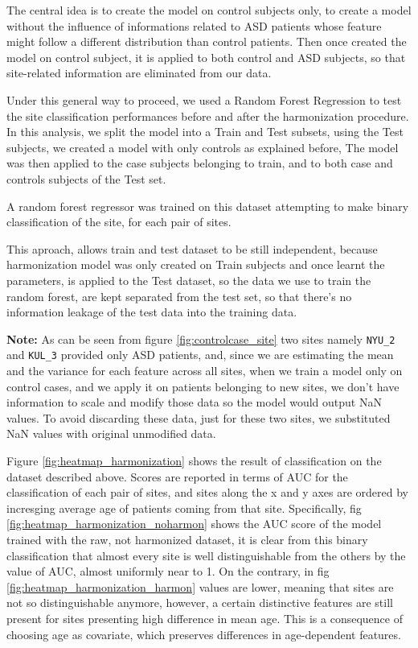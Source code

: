 \documentclass[a4paper,11pt]{article}
\begin{document}

The central idea is to create the model on control subjects only, to create a model without the influence of informations related to ASD patients whose feature might follow a different distribution than control patients.
Then once created the model on control subject, it is applied to both control and ASD subjects, so that site-related information are eliminated from our data.

Under this general way to proceed, we used a Random Forest Regression to test the site classification performances before and after the harmonization procedure.
In this analysis, we split the model into a Train and Test subsets, using the Test subjects, we created a model with only controls as explained before,
The model was then applied to the case subjects belonging to train, and to both case and controls subjects of the Test set.

A random forest regressor was trained on this dataset attempting to make binary classification of the site, for each pair of sites.

This aproach, allows train and test dataset to be still independent, because harmonization model was only created on Train subjects and once learnt the parameters, is applied to the Test dataset, so the data we use to train the random forest, are kept separated from the test set, so that there's no information leakage of the test data into the training data.
\newline

\textbf{Note:} As can be seen from figure \ref{fig:controlcase_site} two sites namely \texttt{NYU\_2} and \texttt{KUL\_3} provided only ASD patients, and, since we are estimating the mean and the variance for each feature across all sites, when we train a model only on control cases, and we apply it on patients belonging to new sites, we don't have information to scale and modify those data so the model would output NaN values.
To avoid discarding these data, just for these two sites, we substituted NaN values with original unmodified data.
\newline

Figure \ref{fig:heatmap_harmonization} shows the result of classification on the dataset described above. Scores are reported in terms of AUC for the classification of each pair of sites, and sites along the x and y axes are ordered by incresging average age of patients coming from that site.
Specifically, fig \ref{fig:heatmap_harmonization_noharmon} shows the AUC score of the model trained with the raw, not harmonized dataset, it is clear from this binary classification that almost every site is well distinguishable from the others by the value of AUC, almost uniformly near to 1.
On the contrary, in fig \ref{fig:heatmap_harmonization_harmon} values are lower, meaning that sites are not so distinguishable anymore, however, a certain distinctive features are still present for sites presenting high difference in mean age.
This is a consequence of choosing age as covariate, which preserves differences in age-dependent features.
\end{document}
